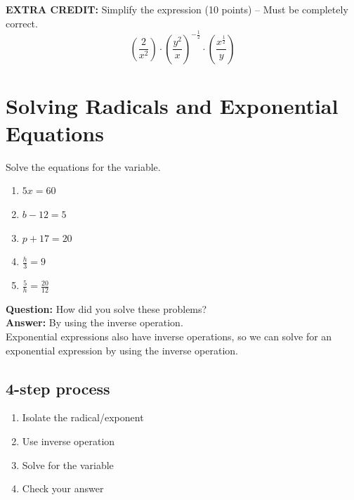 \documentclass[12pt]{article}
\begin{document}
\hrulefill

\textbf{EXTRA CREDIT:} Simplify the expression (10 points) -- Must be completely correct.\\

$$\left(\frac{2}{x^2}\right) \cdot \left(\frac{y^2}{x}\right)^{-\frac{1}{2}} \cdot \left(\frac{x^{\frac{1}{2}}}{y}\right)$$

\section{Solving Radicals and Exponential Equations}

Solve the equations for the variable.\\

\begin{enumerate}

	\item $5x=60$\\
	
	\item $b-12=5$\\
	
	\item $p+17=20$\\
	
	\item $\frac{h}{3}=9$\\
	
	\item $\frac{5}{h}=\frac{20}{12}$\\

\end{enumerate}

\textbf{Question:} How did you solve these problems?\\

\textbf{Answer:} By using the inverse operation.\\

Exponential expressions also have inverse operations, so we can solve for an exponential expression by using the inverse operation. \\

\subsection{4-step process}

\begin{enumerate}

	\item Isolate the radical/exponent\\
	
	\item Use inverse operation\\
	
	\item Solve for the variable\\
	
	\item Check your answer\\
\end{enumerate}
\end{document}

